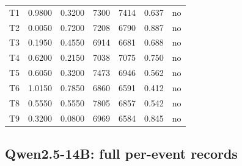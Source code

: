 \begin{table}[!htbp]
\begin{tabular}{lrrrrrl}
T1 & 0.9800 & 0.3200 & 7300 & 7414 & 0.637 & no \\
T2 & 0.0050 & 0.7200 & 7208 & 6790 & 0.887 & no \\
T3 & 0.1950 & 0.4550 & 6914 & 6681 & 0.688 & no \\
T4 & 0.6200 & 0.2150 & 7038 & 7075 & 0.750 & no \\
T5 & 0.6050 & 0.3200 & 7473 & 6946 & 0.562 & no \\
T6 & 1.0150 & 0.7850 & 6860 & 6591 & 0.412 & no \\
T8 & 0.5550 & 0.5550 & 7805 & 6857 & 0.542 & no \\
T9 & 0.3200 & 0.0800 & 6969 & 6584 & 0.845 & no \\
\bottomrule
\end{tabular}
\end{table}


\clearpage\subsection{Qwen2.5-14B: full per-event records}

